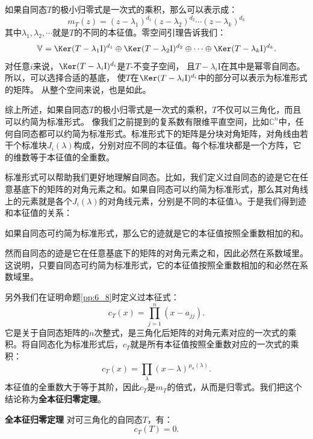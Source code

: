 \documentclass[12pt,UTF8,fontset=none]{ctexbook}
\begin{document}
如果自同态$T$的极小归零式是一次式的乘积，那么可以表示成：
$$ m_T(z) = (z - \lambda_1)^{d_1} (z - \lambda_2)^{d_2} \cdots  (z - \lambda_k)^{d_k}$$
其中$\lambda_1, \lambda_2,\cdots$就是$T$的不同的本征值。零空间引理告诉我们：
$$ \mathbb{V} = \Ker (T - \lambda_1\mathrm{I})^{d_1} \oplus \Ker (T - \lambda_2\mathrm{I})^{d_2} \oplus \cdots \oplus \Ker (T - \lambda_k\mathrm{I})^{d_k}.$$
对任意$i$来说，$\Ker (T - \lambda_i\mathrm{I})^{d_i}$是$T$-不变子空间，
且$T - \lambda_i\mathrm{I}$在其中是幂零自同态。所以，可以选择合适的基底，
使$T$在$\Ker (T - \lambda_i\mathrm{I})^{d_i}$中的部分可以表示为标准形式的矩阵。
从整个空间来说，也是如此。

综上所述，如果自同态$T$的极小归零式是一次式的乘积，$T$不仅可以三角化，而且可以约简为标准形式。
像我们之前提到的复系数有限维平直空间，比如$\mathbb{C}^n$中，任何自同态都可以约简为标准形式。标准形式下的矩阵是分块对角矩阵，对角线由若干个标准块$J_i(\lambda)$构成，分别对应不同的本征值。每个标准块都是一个方阵，它的维数等于本征值的全重数。

标准形式可以帮助我们更好地理解自同态。比如，我们定义过自同态的迹是它在任意基底下的矩阵的对角元素之和。如果自同态可以约简为标准形式，那么其对角线上的元素就是各个$J_i(\lambda)$的对角线元素，分别是不同的本征值$\lambda$。于是我们得到迹和本征值的关系：
\begin{tm}
    如果自同态可约简为标准形式，那么它的迹就是它的本征值按照全重数相加的和。
\end{tm}
然而自同态的迹是它在任意基底下的矩阵的对角元素之和，因此必然在系数域里。这说明，只要自同态可约简为标准形式，它的本征值按照全重数相加的和必然在系数域里。

另外我们在证明命题\ref{pp:6_8}时定义过本征式：
$$
c_T(x) = \prod_{j=1}^n(x - a_{jj}).
$$
它是关于自同态矩阵的$n$次整式，是三角化后矩阵的对角元素对应的一次式的乘积。将自同态化为标准形式后，$c_T$就是所有本征值按照全重数对应的一次式的乘积：
$$
c_T(x) = \prod_{\lambda}(x - \lambda)^{\mu_{a}(\lambda)}.
$$
本征值的全重数大于等于其阶，因此$c_T$是$m_T$的倍式，从而是归零式。我们把这个结论称为\textbf{全本征归零定理}。
\begin{tm}{\textbf{全本征归零定理}}
    对可三角化的自同态$T$，有：
    $$ c_T(T) = 0. $$
\end{tm}
\end{document}
